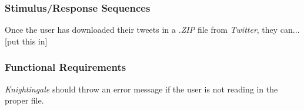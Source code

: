 \documentclass[a4paper, 12pt]{article}
\begin{document}
\subsubsection{Stimulus/Response Sequences} \label{sec:stimulus}
\begin{adjustwidth}{3em}{0pt}
Once the user has downloaded their tweets in a \textit{.ZIP} file from \textit{Twitter}, they can...[put this in]
\end{adjustwidth}

\subsubsection{Functional Requirements} \label{sec:func}
\begin{adjustwidth}{3em}{0pt}
\textit{Knightingale} should throw an error message if the user is not reading in the proper file.
\end{adjustwidth}
\end{document}
